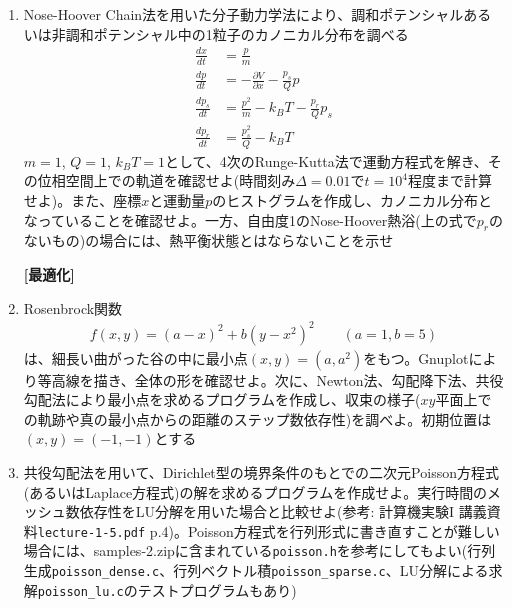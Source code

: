 \documentclass[11pt]{jarticle}
\begin{document}
\begin{enumerate}
\item Nose-Hoover Chain法を用いた分子動力学法により、調和ポテンシャルあるいは非調和ポテンシャル中の1粒子のカノニカル分布を調べる
  \begin{align*}
    \frac{dx}{dt} &= \frac{p}{m} \\
    \frac{dp}{dt} &= -\frac{\partial V}{\partial x} - \frac{p_s}{Q} p \\
    \frac{dp_s}{dt} &= \frac{p^2}{m} - k_B T - \frac{p_r}{Q} p_s \\
    \frac{dp_r}{dt} &= \frac{p_s^2}{Q} - k_B T
  \end{align*}
  $m=1$, $Q=1$, $k_BT=1$として、4次のRunge-Kutta法で運動方程式を解き、その位相空間上での軌道を確認せよ(時間刻み$\Delta=0.01$で$t=10^4$程度まで計算せよ)。また、座標$x$と運動量$p$のヒストグラムを作成し、カノニカル分布となっていることを確認せよ。一方、自由度1のNose-Hoover熱浴(上の式で$p_r$のないもの)の場合には、熱平衡状態とはならないことを示せ

\clearpage
  
\hspace*{-2em} {\bf [最適化]}

\item Rosenbrock関数
  \begin{align*}
    f(x,y) = (a - x)^2 + b(y-x^2)^2 \qquad (a=1, b=5)
  \end{align*}
  は、細長い曲がった谷の中に最小点$(x,y)=(a,a^2)$をもつ。Gnuplotにより等高線を描き、全体の形を確認せよ。次に、Newton法、勾配降下法、共役勾配法により最小点を求めるプログラムを作成し、収束の様子($xy$平面上での軌跡や真の最小点からの距離のステップ数依存性)を調べよ。初期位置は$(x,y)=(-1,-1)$とする

\item 共役勾配法を用いて、Dirichlet型の境界条件のもとでの二次元Poisson方程式(あるいはLaplace方程式)の解を求めるプログラムを作成せよ。実行時間のメッシュ数依存性をLU分解を用いた場合と比較せよ(参考: 計算機実験I 講義資料{\tt lecture-1-5.pdf} p.4)。Poisson方程式を行列形式に書き直すことが難しい場合には、samples-2.zipに含まれている{\tt poisson.h}を参考にしてもよい(行列生成{\tt poisson\_dense.c}、行列ベクトル積{\tt poisson\_sparse.c}、LU分解による求解{\tt poisson\_lu.c}のテストプログラムもあり)


\end{enumerate}
\end{document}
